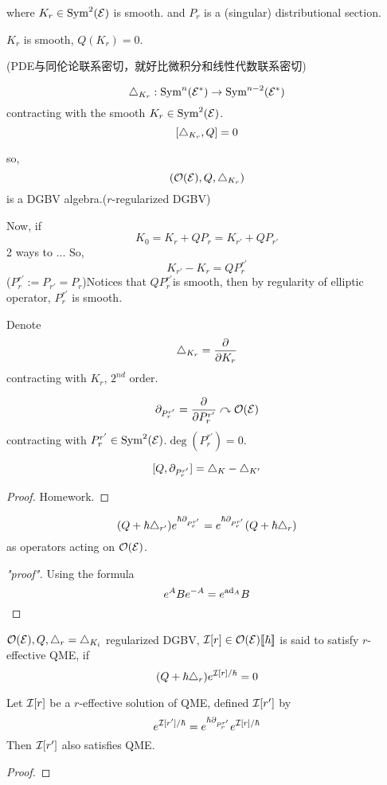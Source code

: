 where $K_r\in\operatorname{Sym}^2(\mathcal{E})$ is smooth.
and $P_r$ is a (singular) distributional section.

$K_r$ is smooth, $Q(K_r)=0$.

{\color{blue}
(PDE与同伦论联系密切，就好比微积分和线性代数联系密切)
}

$$\triangle_{K_r}:\operatorname{Sym}^n(\mathcal{E}^*)\to\operatorname{Sym}^{n-2}(\mathcal{E}^*)$$
contracting with the smooth $K_r\in\operatorname{Sym}^2(\mathcal{E})$.
$$[\triangle_{K_r},Q]=0$$

so,
$$(\mathcal{O}(\mathcal{E}),Q,\triangle_{K_r})$$
is a DGBV algebra.($r$-regularized DGBV)

Now, if
$$K_0=K_r+QP_r=K_{r'}+QP_{r'}$$
2 ways to ...
So,
$$K_{r'}-K_r=QP^{r'}_r$$
($P_r^{r'}:=P_{r'}=P_r$)Notices that
$QP^{r'}_r$is smooth, then by regularity of elliptic operator,
$P^{r'}_r$ is smooth.

Denote
$$\triangle_{K_r}=\frac{\partial } {\partial K_r}$$
contracting with $K_r$, $2^{nd}$ order.

$$\partial_{P_r^{r'}}=\frac{\partial } {\partial P_r^{r'}}\curvearrowright\mathcal{O}(\mathcal{E})$$
contracting with $P_r^{r'}\in\operatorname{Sym}^2(\mathcal{E})$.$\deg(P_r^{r'})=0$.

\begin{lemma}
$$[Q,\partial_{P_r^{r'}}]=\triangle_{K}-\triangle_{K'}$$
\end{lemma}
\begin{proof}
Homework.
\end{proof}

\begin{cor}
$$(Q+\hbar\triangle_{r'})e^{\hbar\partial_{P_r^{r'}}}
=e^{\hbar\partial_{P^{r'}_r}}(Q+\hbar\triangle_r)
$$
as operators acting on $\mathcal{O}(\mathcal{E})$.
\end{cor}
\begin{proof}["proof"]
Using the formula
$$e^ABe^{-A}=e^{\operatorname{ad}_A}B$$
\end{proof}


\begin{definition}
$\mathcal{O}(\mathcal{E}),Q,\triangle_r=\triangle_{K_i}$ regularized DGBV,
$\mathcal{I}[r]\in\mathcal{O}(\mathcal{E})[\![\hbar]\!]$ is said to satisfy
$r$-effective QME, if
$$(Q+\hbar\triangle_r)e^{\mathcal{I}[r]/\hbar}=0$$
\end{definition}
\begin{prop}
Let $\mathcal{I}[r]$ be a $r$-effective solution of QME, defined
$\mathcal{I}[r']$ by
$$e^{\mathcal{I}[r']/\hbar}=e^{\hbar\partial_{P_r^{r'}}}e^{\mathcal{I}[r]/\hbar}$$
Then $\mathcal{I}[r']$ also satisfies QME.
\end{prop}

\begin{proof}
\end{proof}

